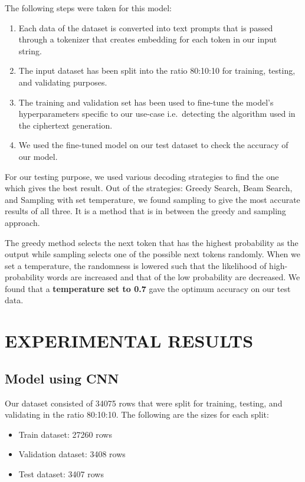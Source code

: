 \documentclass[a4paper]{article}
\begin{document}
\newpage

The following steps were taken for this model:
\begin{enumerate}
    \item   Each data of the dataset is converted into text prompts 
            that is passed through a tokenizer that creates embedding 
            for each token in our input string. 
    \item   The input dataset has been split into the ratio 
            80:10:10 for training, testing, and validating purposes.
    \item   The training and validation set has been used to 
            fine-tune the model’s hyperparameters specific to 
            our use-case i.e.\ detecting the algorithm used in 
            the ciphertext generation.
    \item   We used the fine-tuned model on our test dataset 
            to check the accuracy of our model. 
\end{enumerate}

For our testing purpose, we used various decoding strategies 
to find the one which gives the best result. Out of the strategies: 
Greedy Search, Beam Search, and Sampling with set temperature, 
we found sampling to give the most accurate results of all three. 
It is a method that is in between the greedy and sampling approach.

The greedy method selects the next token that has the highest 
probability as the output while sampling selects one of the 
possible next tokens randomly. When we set a temperature, the 
randomness is lowered such that the likelihood of high-probability 
words are increased and that of the low probability are decreased. 
We found that a \textbf{temperature set to 0.7} gave the optimum accuracy 
on our test data. 

\section{EXPERIMENTAL RESULTS}
\subsection{Model using CNN}

Our dataset consisted of 34075 rows that were split for training, 
testing, and validating in the ratio 80:10:10. The following 
are the sizes for each split:
\begin{itemize}
    \item Train dataset: 27260 rows
    \item Validation dataset: 3408 rows
    \item Test dataset: 3407 rows
\end{itemize}
\end{document}
